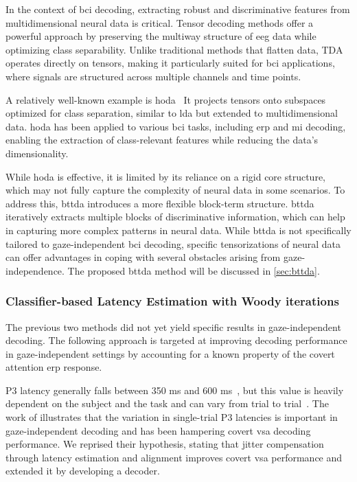 In the context of \ac{bci} decoding, extracting robust and discriminative
features from multidimensional neural data is critical.
Tensor decoding methods offer a powerful approach by preserving the multiway structure
of \ac{eeg} data while optimizing class separability.
Unlike traditional methods that flatten data, TDA operates directly on tensors,
making it particularly suited for \ac{bci} applications, where signals are structured
across multiple channels and time points.

A relatively well-known example is \ac{hoda}~\cite{Phan2010}
It projects tensors onto subspaces optimized for class separation, similar to \ac{lda} but extended to multidimensional data.
\Ac{hoda} has been applied to various \ac{bci} tasks, including \ac{erp} and
\ac{mi} decoding, enabling the extraction of class-relevant features while reducing
the data's dimensionality.

While \ac{hoda} is effective, it is limited by its reliance on a rigid core
structure, which may not fully capture the complexity of neural data in some
scenarios. To address this, \ac{bttda}
introduces a more flexible block-term structure.
\ac{bttda} iteratively extracts multiple blocks of
discriminative information, which can help in capturing more complex patterns
in neural data.
While \ac{bttda} is not specifically tailored to
gaze-independent \ac{bci} decoding, specific tensorizations of neural data can
offer advantages in coping with several obstacles arising from
gaze-independence.
The proposed \ac{bttda} method will be discussed in \cref{sec:bttda}.

\subsubsection{Classifier-based Latency Estimation with Woody iterations}

The previous two methods did not yet yield specific results in gaze-independent
decoding.
The following approach is targeted at improving decoding performance in
gaze-independent settings by accounting for a known property of the covert
attention \ac{erp} response.

P3 latency generally falls between 350 ms and 600 ms~\cite{Luck2014}, but this
value is heavily dependent on the subject and the task and can vary from trial
to trial~\cite{Ouyang2017}.
The work of \cite{Arico2014} illustrates that the variation in single-trial P3
latencies is important in gaze-independent decoding and has been hampering covert
\ac{vsa} decoding performance.
We reprised their hypothesis, stating that jitter compensation through latency
estimation and alignment improves
covert \ac{vsa} performance and extended it by developing a decoder.

